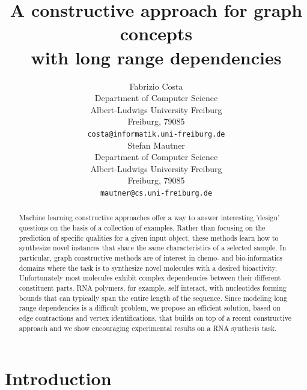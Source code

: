 \documentclass{article}
\title{A constructive approach for graph concepts\\with long range dependencies}
\author{
  Fabrizio Costa \\
  Department of Computer Science\\
  Albert-Ludwigs University Freiburg\\
  Freiburg, 79085  \\
  \texttt{costa@informatik.uni-freiburg.de} \\
  \And
  Stefan Mautner\\
  Department of Computer Science\\
  Albert-Ludwigs University Freiburg\\
  Freiburg, 79085  \\
  \texttt{mautner@cs.uni-freiburg.de} \\
}
\begin{document}

\maketitle

\begin{abstract}

Machine learning constructive approaches offer a way to answer interesting
'design' questions on the basis of a collection of examples. Rather than
focusing on the prediction of specific qualities for a given input object,
these methods learn how to synthesize novel instances that share the same
characteristics of a selected sample. In particular, graph constructive
methods are of interest in chemo- and bio-informatics domains where the task
is to synthesize novel molecules with a desired bioactivity. Unfortunately
most molecules exhibit complex dependencies between their different
constituent parts. RNA polymers, for example, self interact, with nucleotides
forming bounds that can typically span the entire length of the sequence.
Since modeling long range dependencies is a difficult problem, we propose an
efficient solution, based on edge contractions and vertex identifications,
that builds on top of a recent constructive approach and we show encouraging
experimental results on a RNA synthesis task.





\end{abstract}
\section{Introduction}
\end{document}
